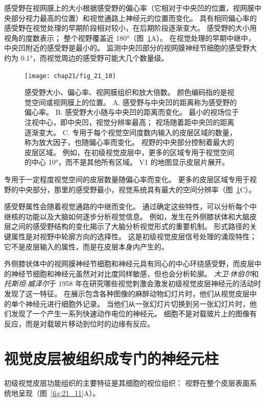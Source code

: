 感受野在视网膜上的大小根据感受野的偏心率（它相对于中央凹的位置，视网膜中央部分视力最高的位置）和视觉通路上神经元的位置而变化。
具有相同偏心率的感受野在视觉处理的早期阶段相对较小，在后期阶段逐渐变大。
感受野的大小用视角的度数表示；
整个视野覆盖近 180°（图~\ref{fig:21_10}A）。
在视觉处理的早期中继中，中央凹附近的感受野是最小的。
监测中央凹部分的视网膜神经节细胞的感受野大约为 0.1°，而视觉周边的感受野可能大几个数量级。


\begin{figure}[htbp]
	\centering
	\texttt{[image: chap21/fig\_21\_10]}
	\caption{感受野大小、偏心率、视网膜组织和放大倍数。
		颜色编码指的是视觉空间或视网膜上的位置。
		A. 感受野与中央凹的距离称为感受野的偏心率。
		B. 感受野大小随与中央凹的距离而变化。
		最小的视场位于注视中心，即中央凹，视觉分辨率最高；
		视场随着距中央凹的距离逐渐变大。
		C. 专用于每个视觉空间度数内输入的皮层区域的数量，称为放大因子，也随偏心率而变化。
		视野的中央部分控制着最大的皮层区域。
		例如，在初级视觉皮层中，更多的区域专用于视觉空间的中心 10°，而不是其他所有区域。
		V1 的地图显示皮层片展开。}
	\label{fig:21_10}
\end{figure}


专用于一定程度视觉空间的皮层数量随偏心率而变化。
更多的皮层区域专用于视野的中央部分，那里的感受野最小，视觉系统具有最大的空间分辨率（图~\ref{fig:21_10}C）。


感受野属性会随着视觉通路的中继而变化。
通过确定这些特性，可以分析每个中继核的功能以及大脑如何逐步分析视觉信息。
例如，发生在外侧膝状体和大脑皮层之间的感受野结构的变化揭示了大脑分析视觉形式的重要机制。
形式路径的关键属性是对视野中轮廓方向的选择性。
这是初级视觉皮层信号处理的涌现特性；
它不是皮层输入的属性，而是在皮层本身内产生的。


外侧膝状体中的视网膜神经节细胞和神经元具有同心的中心环绕感受野，而皮层中的神经节细胞和神经元虽然对对比度同样敏感，但也会分析轮廓。
\textit{大卫$\cdot$休伯尔}和\textit{托斯坦$\cdot$威泽尔}于 1958 年在研究哪些视觉刺激会激发初级视觉皮层神经元的活动时发现了这一特征。
在展示包含各种图像的麻醉动物幻灯片时，他们从视觉皮层中的单个神经元进行细胞外记录。
当他们从一张幻灯片切换到另一张幻灯片时，他们发现了一个产生一系列快速动作电位的神经元。
细胞不是对载玻片上的图像有反应，而是对载玻片移动到位时的边缘有反应。



\section{视觉皮层被组织成专门的神经元柱}

初级视觉皮层功能组织的主要特征是其细胞的视位组织：
视野在整个皮层表面系统地呈现（图~\ref{fig:21_11}A）。


